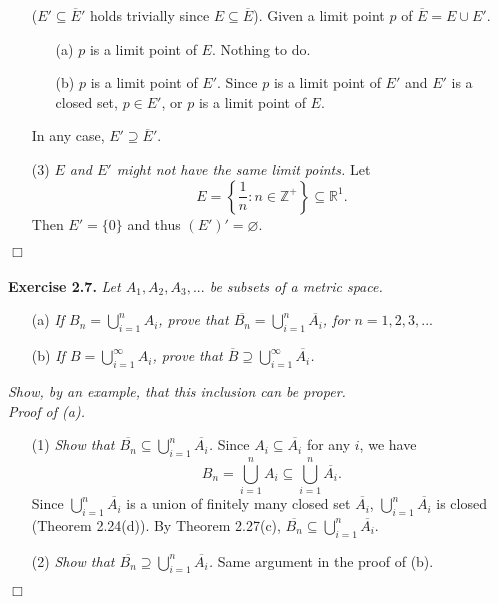\documentclass{article}
\begin{document}
\begin{enumerate}
($E' \subseteq \overline{E}'$ holds trivially since $E \subseteq \overline{E}$).
Given a limit point $p$ of $\overline{E} = E \cup E'$.
  \begin{enumerate}
  \item[(a)]
  $p$ is a limit point of $E$. Nothing to do.
  \item[(b)]
  $p$ is a limit point of $E'$.
  Since $p$ is a limit point of $E'$ and $E'$ is a closed set,
  $p \in E'$, or $p$ is a limit point of $E$.
  \end{enumerate}
In any case, $E' \supseteq \overline{E}'$.
\item[(3)]
\emph{$E$ and $E'$ might not have the same limit points.}
Let
$$E = \left\{ \frac{1}{n} : n \in \mathbb{Z}^+ \right\} \subseteq \mathbb{R}^1.$$
Then $E' = \{0\}$ and thus $(E')' = \varnothing$.
\end{enumerate}
$\Box$ \\\\






\textbf{Exercise 2.7.}
\emph{Let $A_1, A_2, A_3, ...$ be subsets of a metric space.}
\begin{enumerate}
\item[(a)]
\emph{If $B_n = \bigcup^{n}_{i=1} A_i$, prove that
$\overline{B_n} = \bigcup^{n}_{i=1}{\overline{A_i}}$, for $n = 1, 2, 3, ...$}
\item[(b)]
\emph{If $B = \bigcup^{\infty}_{i=1} A_i$,
prove that $\overline{B} \supseteq \bigcup^{\infty}_{i=1} \overline{A_i}$.}
\end{enumerate}
\emph{Show, by an example, that this inclusion can be proper. } \\

\emph{Proof of (a).}
\begin{enumerate}
  \item[(1)]
  \emph{Show that $\overline{B_n} \subseteq \bigcup^{n}_{i=1}{\overline{A_i}}$.}
  Since $A_i \subseteq \overline{A_i}$ for any $i$, we have
  $$B_n = \bigcup^{n}_{i=1} A_i \subseteq \bigcup^{n}_{i=1} \overline{A_i}.$$
  Since $\bigcup^{n}_{i=1} \overline{A_i}$ is a union of finitely many
  closed set $\overline{A_i}$, $\bigcup^{n}_{i=1} \overline{A_i}$ is closed
  (Theorem 2.24(d)).
  By Theorem 2.27(c), $\overline{B_n} \subseteq \bigcup^{n}_{i=1} \overline{A_i}$.
  \item[(2)]
  \emph{Show that $\overline{B_n} \supseteq \bigcup^{n}_{i=1}{\overline{A_i}}$.}
  Same argument in the proof of (b).
\end{enumerate}
$\Box$\\
\end{document}
